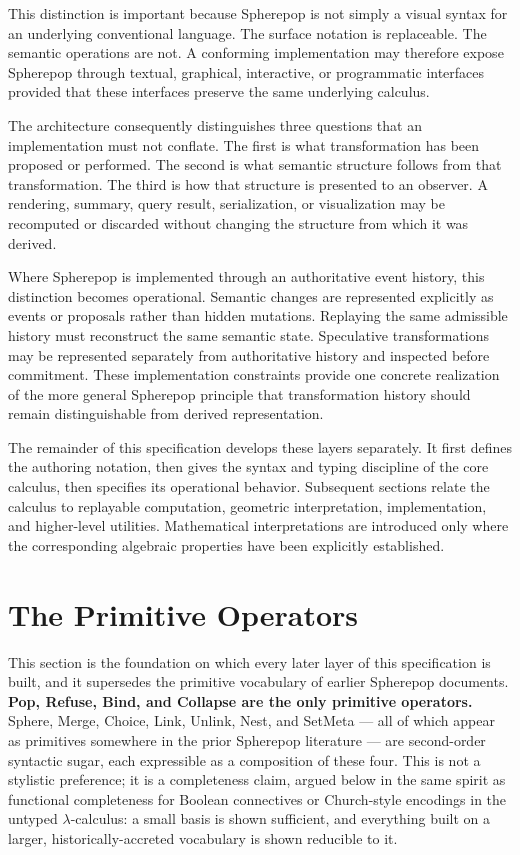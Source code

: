 \documentclass[12pt]{article}
\theoremstyle{definition}
\begin{document}
This distinction is important because Spherepop is not simply a visual syntax for an underlying conventional language. The surface notation is replaceable. The semantic operations are not. A conforming implementation may therefore expose Spherepop through textual, graphical, interactive, or programmatic interfaces provided that these interfaces preserve the same underlying calculus.

The architecture consequently distinguishes three questions that an implementation must not conflate. The first is what transformation has been proposed or performed. The second is what semantic structure follows from that transformation. The third is how that structure is presented to an observer. A rendering, summary, query result, serialization, or visualization may be recomputed or discarded without changing the structure from which it was derived.

Where Spherepop is implemented through an authoritative event history, this distinction becomes operational. Semantic changes are represented explicitly as events or proposals rather than hidden mutations. Replaying the same admissible history must reconstruct the same semantic state. Speculative transformations may be represented separately from authoritative history and inspected before commitment. These implementation constraints provide one concrete realization of the more general Spherepop principle that transformation history should remain distinguishable from derived representation.

The remainder of this specification develops these layers separately. It first defines the authoring notation, then gives the syntax and typing discipline of the core calculus, then specifies its operational behavior. Subsequent sections relate the calculus to replayable computation, geometric interpretation, implementation, and higher-level utilities. Mathematical interpretations are introduced only where the corresponding algebraic properties have been explicitly established.

\section{The Primitive Operators}
\label{sec:primitives}

This section is the foundation on which every later layer of this specification is built, and it supersedes the primitive vocabulary of earlier Spherepop documents. \textbf{Pop, Refuse, Bind, and Collapse are the only primitive operators.} Sphere, Merge, Choice, Link, Unlink, Nest, and SetMeta — all of which appear as primitives somewhere in the prior Spherepop literature — are second-order syntactic sugar, each expressible as a composition of these four. This is not a stylistic preference; it is a completeness claim, argued below in the same spirit as functional completeness for Boolean connectives or Church-style encodings in the untyped $\lambda$-calculus: a small basis is shown sufficient, and everything built on a larger, historically-accreted vocabulary is shown reducible to it.
\end{document}
